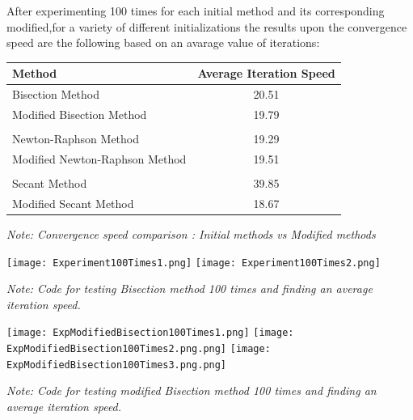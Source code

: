 \documentclass{article}
\begin{document}
After experimenting 100 times for each initial method and its corresponding modified,for a variety of different initializations the results upon the convergence speed are the following based on an avarage value of iterations:
\begin{tcolorbox}[colback=blue!10, colframe=gray!80, width=\textwidth, sharp corners]
    \centering
    \begin{tabular}{|l|c|}
        \hline
        \textbf{Method} & \textbf{Average Iteration Speed} \\ \hline
        Bisection Method & 20.51 \\ \hline
        Modified Bisection Method & 19.79 \\ \hline
        \multicolumn{2}{|c|}{} \\ \hline 
        Newton-Raphson Method & 19.29\\ \hline
        Modified Newton-Raphson Method & 19.51 \\ \hline
        \multicolumn{2}{|c|}{} \\ \hline
        Secant Method & 39.85\\ \hline
        Modified Secant Method & 18.67 \\ \hline
    \end{tabular}

    \vspace{0.5cm}

    \small\textit{Note: Convergence speed comparison : Initial methods vs Modified methods}
\end{tcolorbox}



\begin{tcolorbox}[colback=gray!10, colframe=gray!80, width=\textwidth, sharp corners]
    \centering 
    \texttt{[image: Experiment100Times1.png]} 
    \texttt{[image: Experiment100Times2.png]} 


    \vspace{0.5cm} 
   
    
    \small\textit{Note: Code for testing Bisection method 100 times and finding an average iteration speed.}
\end{tcolorbox}

\begin{tcolorbox}[colback=gray!10, colframe=gray!80, width=\textwidth, sharp corners]
    \centering 
    


    \vspace{0.6cm} 
    \texttt{[image: ExpModifiedBisection100Times1.png]} 
    \texttt{[image: ExpModifiedBisection100Times2.png.png]}
    \texttt{[image: ExpModifiedBisection100Times3.png.png]}
    
    
    \small\textit{Note: Code for testing  modified Bisection method 100 times and finding an average iteration speed.}
\end{tcolorbox}
\end{document}
